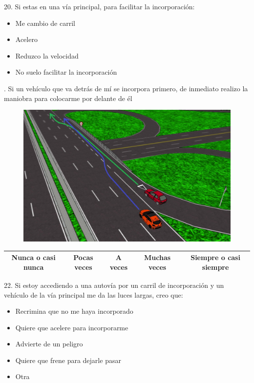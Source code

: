 20. Si estas en una vía principal, para facilitar la incorporación: 
   \begin{itemize}
        \item Me cambio de carril
        \item Acelero
        \item Reduzco la velocidad
        \item No suelo facilitar la incorporación
   \end{itemize}
\vspace{-10pt}

. Si un vehículo que va detrás de mí se incorpora primero, de inmediato realizo la maniobra para colocarme por delante de él 
\begin{figure}[h]
    \centering
    \includegraphics[width=14cm]
    {figures/A5.png}
\end{figure}
\vspace{-10pt}
\begin{table}[h]
\centering
\begin{tabular}{|c|c|c|c|c|}
\hline
Nunca o casi nunca & Pocas veces & A veces & Muchas veces & Siempre o casi siempre \\ \hline
\end{tabular}
\end{table}

22. Si estoy accediendo a una autovía por un carril de incorporación y un vehículo de la vía principal me da las luces largas, creo que:
   \begin{itemize}
        \item Recrimina que no me haya incorporado
        \item Quiere que acelere para incorporarme
        \item Advierte de un peligro
        \item Quiere que frene para dejarle pasar
        \item Otra
   \end{itemize}
\vspace{10pt}

